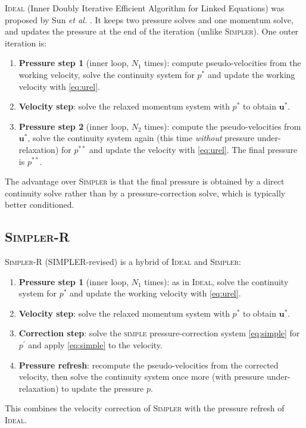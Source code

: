 \documentclass[11pt,a4paper]{article}
\newcommand{\vc}[1]{\mathbf{#1}}            %
\begin{document}
\textsc{Ideal} (Inner Doubly Iterative Efficient Algorithm for Linked
Equations) was proposed by Sun \emph{et al.} \cite{sun2007}.  It keeps two
pressure solves and one momentum solve, and updates
the pressure at the end of the iteration (unlike \textsc{Simpler}).  One outer
iteration is:
\begin{enumerate}[leftmargin=1.5em]
\item \textbf{Pressure step 1} (inner loop, $N_{1}$ times): compute
  pseudo-velocities from the working velocity, solve the continuity system for
  $p^{*}$ and update the working velocity with \eqref{eq:urel}.
\item \textbf{Velocity step}: solve the relaxed momentum system with $p^{*}$
  to obtain $\vc{u}^{*}$.
\item \textbf{Pressure step 2} (inner loop, $N_{2}$ times): compute the
  pseudo-velocities from $\vc{u}^{*}$, solve the continuity system again (this
  time \emph{without} pressure under-relaxation) for $p^{**}$ and update the
  velocity with \eqref{eq:urel}.  The final pressure is $p^{**}$.
\end{enumerate}
The advantage over \textsc{Simpler} is that the final pressure is obtained by
a direct continuity solve rather than by a pressure-correction solve, which is
typically better conditioned.

\subsection{\textsc{Simpler-R}}
\label{sec:simplerr}

\textsc{Simpler-R} (SIMPLER-revised) \cite{li2017} is a hybrid of
\textsc{Ideal} and \textsc{Simpler}:
\begin{enumerate}[leftmargin=1.5em]
\item \textbf{Pressure step 1} (inner loop, $N_{1}$ times): as in
  \textsc{Ideal}, solve the continuity system for $p^{*}$ and update the
  working velocity with \eqref{eq:urel}.
\item \textbf{Velocity step}: solve the relaxed momentum system with $p^{*}$
  to obtain $\vc{u}^{*}$.
\item \textbf{Correction step}: solve the \textsc{simple} pressure-correction
  system \eqref{eq:simple} for $p^{\prime}$ and apply \eqref{eq:simple} to the
  velocity.
\item \textbf{Pressure refresh}: recompute the pseudo-velocities from the
  corrected velocity, then solve the continuity system once more (with pressure
  under-relaxation) to update the pressure $p$.
\end{enumerate}
This combines the velocity correction of \textsc{Simpler} with the pressure
refresh of \textsc{Ideal}.
\end{document}
